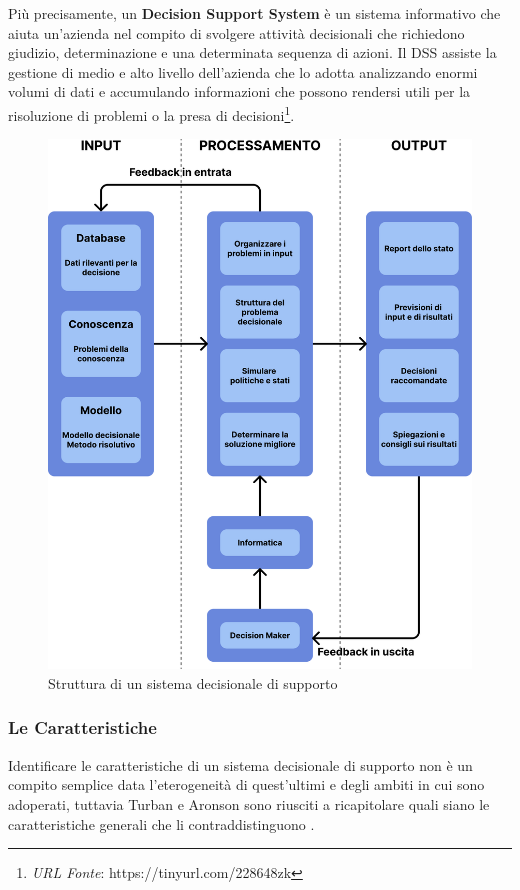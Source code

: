 Più precisamente, un \textbf{Decision Support System} è un sistema informativo che aiuta un'azienda nel compito di svolgere attività decisionali che richiedono giudizio, determinazione e una determinata sequenza di azioni. Il DSS assiste la gestione di medio e alto livello dell'azienda che lo adotta analizzando enormi volumi di dati e accumulando informazioni che possono rendersi utili per la risoluzione di problemi o la presa di decisioni\footnote{\textit{URL Fonte}: https://tinyurl.com/228648zk}.

\begin{figure} [H]
    \centering
    \includegraphics[height=1\linewidth]{figure/capitolo_2/Decision Support System Structure.pdf}
    \caption{Struttura di un sistema decisionale di supporto}
    \label{fig:Decision Support System Structure}
\end{figure}

\subsubsection{Le Caratteristiche}

Identificare le caratteristiche di un sistema decisionale di supporto non è un compito semplice data l'eterogeneità di quest'ultimi e degli ambiti in cui sono adoperati, tuttavia Turban e Aronson sono riusciti a ricapitolare quali siano le caratteristiche generali che li contraddistinguono \cite{dss_characteristics}.

